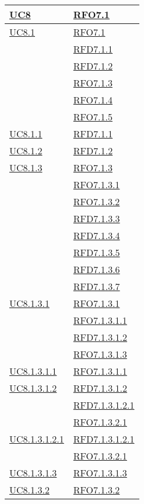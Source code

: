\begin{longtable}{|>{\centering}m{5cm}|m{5cm}<{\centering}|}
\hyperref[UC8]{UC8} & \hyperlink{RFO7.1}{RFO7.1}\\ \hline
\hyperref[UC8.1]{UC8.1} & \hyperlink{RFO7.1}{RFO7.1}\\
& \hyperlink{RFD7.1.1}{RFD7.1.1}\\
& \hyperlink{RFD7.1.2}{RFD7.1.2}\\
& \hyperlink{RFO7.1.3}{RFO7.1.3}\\
& \hyperlink{RFO7.1.4}{RFO7.1.4}\\
& \hyperlink{RFO7.1.5}{RFO7.1.5}\\ \hline
\hyperref[UC8.1.1]{UC8.1.1} & \hyperlink{RFD7.1.1}{RFD7.1.1}\\ \hline
\hyperref[UC8.1.2]{UC8.1.2} & \hyperlink{RFD7.1.2}{RFD7.1.2}\\ \hline
\hyperref[UC8.1.3]{UC8.1.3} & \hyperlink{RFO7.1.3}{RFO7.1.3}\\
& \hyperlink{RFO7.1.3.1}{RFO7.1.3.1}\\
& \hyperlink{RFO7.1.3.2}{RFO7.1.3.2}\\
& \hyperlink{RFD7.1.3.3}{RFD7.1.3.3}\\
& \hyperlink{RFD7.1.3.4}{RFD7.1.3.4}\\
& \hyperlink{RFD7.1.3.5}{RFD7.1.3.5}\\
& \hyperlink{RFD7.1.3.6}{RFD7.1.3.6}\\
& \hyperlink{RFD7.1.3.7}{RFD7.1.3.7}\\ \hline
\hyperref[UC8.1.3.1]{UC8.1.3.1} & \hyperlink{RFO7.1.3.1}{RFO7.1.3.1}\\
& \hyperlink{RFO7.1.3.1.1}{RFO7.1.3.1.1}\\
& \hyperlink{RFD7.1.3.1.2}{RFD7.1.3.1.2}\\
& \hyperlink{RFO7.1.3.1.3}{RFO7.1.3.1.3}\\ \hline
\hyperref[UC8.1.3.1.1]{UC8.1.3.1.1} & \hyperlink{RFO7.1.3.1.1}{RFO7.1.3.1.1}\\ \hline
\hyperref[UC8.1.3.1.2]{UC8.1.3.1.2} & \hyperlink{RFD7.1.3.1.2}{RFD7.1.3.1.2}\\
& \hyperlink{RFD7.1.3.1.2.1}{RFD7.1.3.1.2.1}\\
& \hyperlink{RFO7.1.3.2.1}{RFO7.1.3.2.1}\\ \hline
\hyperref[UC8.1.3.1.2.1]{UC8.1.3.1.2.1} & \hyperlink{RFD7.1.3.1.2.1}{RFD7.1.3.1.2.1}\\
& \hyperlink{RFO7.1.3.2.1}{RFO7.1.3.2.1}\\ \hline
\hyperref[UC8.1.3.1.3]{UC8.1.3.1.3} & \hyperlink{RFO7.1.3.1.3}{RFO7.1.3.1.3}\\ \hline
\hyperref[UC8.1.3.2]{UC8.1.3.2} & \hyperlink{RFO7.1.3.2}{RFO7.1.3.2}\\

\end{longtable}
